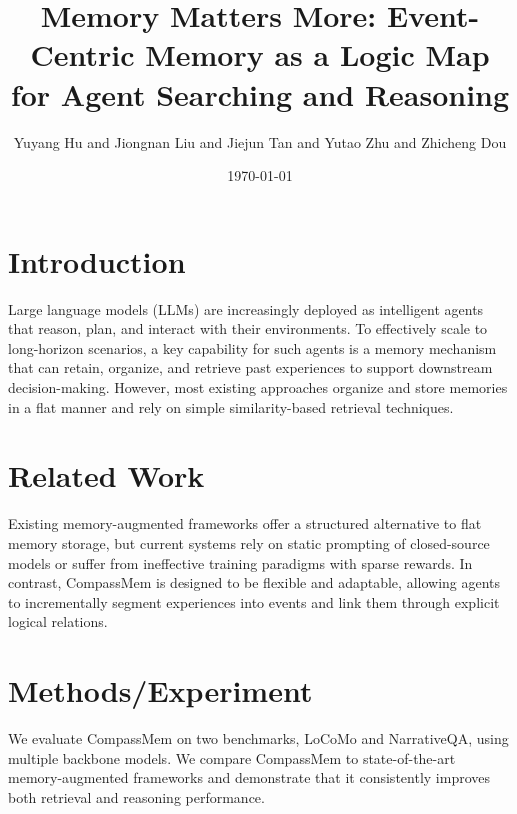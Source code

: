 \documentclass{article}
\title{Memory Matters More: Event-Centric Memory as a Logic Map for Agent Searching and Reasoning}
\author{Yuyang Hu and Jiongnan Liu and Jiejun Tan and Yutao Zhu and Zhicheng Dou}
\date{\today}
\begin{document}
\maketitle


\section{Introduction}

Large language models (LLMs) are increasingly deployed as intelligent agents that reason, plan, and interact with their environments. To effectively scale to long-horizon scenarios, a key capability for such agents is a memory mechanism that can retain, organize, and retrieve past experiences to support downstream decision-making. However, most existing approaches organize and store memories in a flat manner and rely on simple similarity-based retrieval techniques.

\section{Related Work}

Existing memory-augmented frameworks offer a structured alternative to flat memory storage, but current systems rely on static prompting of closed-source models or suffer from ineffective training paradigms with sparse rewards. In contrast, CompassMem is designed to be flexible and adaptable, allowing agents to incrementally segment experiences into events and link them through explicit logical relations.

\section{Methods/Experiment}

We evaluate CompassMem on two benchmarks, LoCoMo and NarrativeQA, using multiple backbone models. We compare CompassMem to state-of-the-art memory-augmented frameworks and demonstrate that it consistently improves both retrieval and reasoning performance.
\end{document}
